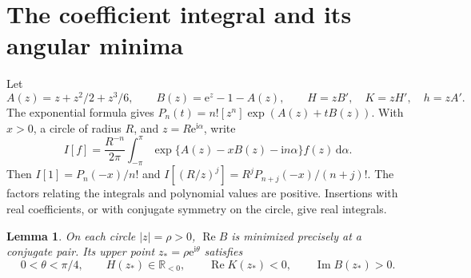 \documentclass[11pt]{article}
\newtheorem{lemma}[theorem]{Lemma}
\DeclareMathOperator{\Rea}{Re}
\DeclareMathOperator{\Ima}{Im}
\newcommand{\ee}{\mathrm e}
\newcommand{\ii}{\mathrm i}
\newcommand{\dd}{\mathrm d}
\newcommand{\R}{\mathbb R}
\begin{document}
\section{The coefficient integral and its angular minima}\label{sec:bulk}
Let
\[
 A(z)=z+z^2/2+z^3/6,\qquad B(z)=\ee^z-1-A(z),\qquad
 H=zB',\quad K=zH',\quad h=zA'.
\]
The exponential formula gives \(P_n(t)=n![z^n]\exp(A(z)+tB(z))\). With \(x>0\), a circle of radius \(R\), and \(z=R\ee^{\ii\alpha}\), write
\[
 I[f]=\frac{R^{-n}}{2\pi}\int_{-\pi}^{\pi}
       \exp\{A(z)-x B(z)-\ii n\alpha\}f(z)\,\dd\alpha .
\]
Then \(I[1]=P_n(-x)/n!\) and
\(I[(R/z)^j]=R^jP_{n+j}(-x)/(n+j)!\). The factors relating the integrals and polynomial values are positive. Insertions with real coefficients, or with conjugate symmetry on the circle, give real integrals.

\begin{lemma}\label{lem:angular}
On each circle \(|z|=\rho>0\), \(\Rea B\) is minimized precisely at a conjugate pair. Its upper point \(z_*=\rho\ee^{\ii\theta}\) satisfies
\[
 0<\theta<\pi/4,\qquad H(z_*)\in\R_{<0},\qquad
 \Rea K(z_*)<0,\qquad \Ima B(z_*)>0.
\]
\end{lemma}
\end{document}
